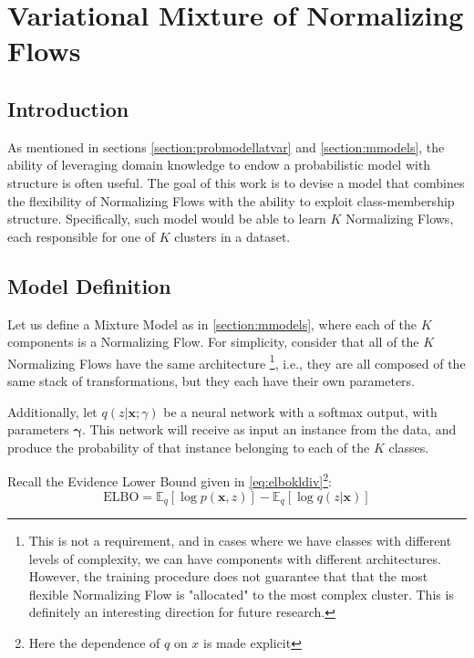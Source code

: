 \chapter{Variational Mixture of Normalizing Flows}
\label{chapter:vmonf}

\section{Introduction}
\label{section:vmonf-intro}

As mentioned in sections \ref{section:probmodellatvar} and \ref{section:mmodels},
the ability of leveraging domain knowledge to endow a probabilistic model with
structure is often useful. The goal of this work is to devise a model that combines
the flexibility of Normalizing Flows with the ability to exploit class-membership
structure. Specifically, such model would be able to learn $K$ Normalizing Flows,
each responsible for one of $K$ clusters in a dataset.

\section{Model Definition}

Let us define a Mixture Model as in \ref{section:mmodels}, where each of the $K$
components is a Normalizing Flow. For simplicity, consider that all of the $K$
Normalizing Flows have the same architecture \footnote{This is not a requirement,
and in cases where we have classes with different levels of complexity, we can
have components with different architectures. However, the training procedure
does not guarantee that that the most flexible Normalizing Flow is "allocated"
to the most complex cluster. This is definitely an interesting direction for future
research.}, i.e., they are all composed of the same stack of transformations,
but they each have their own parameters.

Additionally, let $q(z|\bm{x};\gamma)$ be a neural network with a softmax output, with
parameters $\bm\gamma$. This network will receive as input an instance from the
data, and produce the probability of that instance belonging to each of the
$K$ classes.

Recall the Evidence Lower Bound given in \ref{eq:elbokldiv}\footnote{Here the
dependence of $q$ on $x$ is made explicit}:
\begin{equation*}
    \text{ELBO} = \mathbb{E}_q [\log p(\bm{x}, z)] - \mathbb{E}_q [\log q(z|\bm{x})]
\end{equation*}

